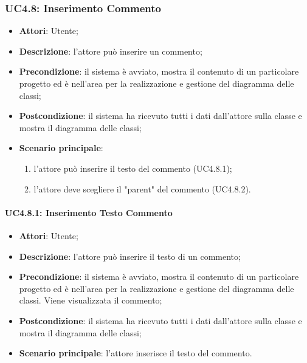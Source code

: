 \subsubsection{UC4.8: Inserimento Commento}
\label{UC4.8}
\begin{itemize}
	\item \textbf{Attori}: Utente;
	\item \textbf{Descrizione}: l'attore può inserire un commento;
	\item \textbf{Precondizione}: il sistema è avviato, mostra il contenuto di un particolare progetto ed è nell'area per la realizzazione e gestione del diagramma delle classi;
	\item \textbf{Postcondizione}: il sistema ha ricevuto tutti i dati dall'attore sulla classe e mostra il diagramma delle classi;
	\item \textbf{Scenario principale}:
	\begin{enumerate}
		\item l'attore può inserire il testo del commento (UC4.8.1);
		\item l'attore deve scegliere il "parent" del commento (UC4.8.2).
	\end{enumerate}
\end{itemize}

\paragraph{UC4.8.1: Inserimento Testo Commento}
\label{UC4.8.1}
\begin{itemize}
	\item \textbf{Attori}: Utente;
	\item \textbf{Descrizione}: l'attore può inserire il testo di un commento;
	\item \textbf{Precondizione}: il sistema è avviato, mostra il contenuto di un particolare progetto ed è nell'area per la realizzazione e gestione del diagramma delle classi. Viene visualizzata il commento;
	\item \textbf{Postcondizione}: il sistema ha ricevuto tutti i dati dall'attore sulla classe e mostra il diagramma delle classi;
	\item \textbf{Scenario principale}: l'attore inserisce il testo del commento.
\end{itemize}

